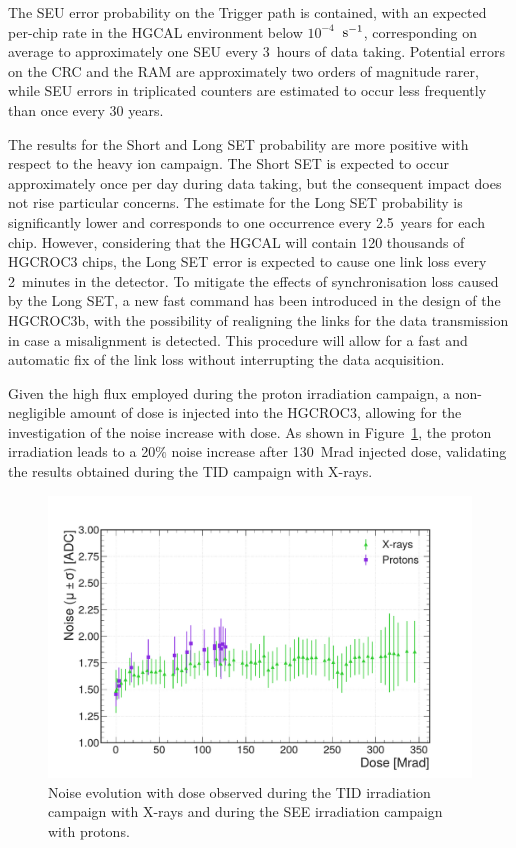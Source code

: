 The SEU error probability on the Trigger path is contained, with an expected per-chip rate in the HGCAL environment below $10^{-4}$~$\textnormal{s}^{-1}$, corresponding on average to approximately one SEU every 3~hours of data taking.
Potential errors on the CRC and the RAM are approximately two orders of magnitude rarer,  while SEU errors in triplicated counters are estimated to occur less frequently than once every 30 years.

The results for the Short and Long SET probability are more positive with respect to the heavy ion campaign. The Short SET is expected to occur approximately once per day during data taking, but the consequent impact does not rise particular concerns.
The estimate for the Long SET probability is significantly lower and corresponds to one occurrence every 2.5~years for each chip. However, considering that the HGCAL will contain 120 thousands of HGCROC3 chips, the Long SET error is expected to cause one link loss every 2~minutes in the detector.
To mitigate the effects of synchronisation loss caused by the Long SET, a new fast command has been introduced in the design of the HGCROC3b, with the possibility of realigning the links for the data transmission in case a misalignment is detected. This procedure will allow for a fast and automatic fix of the link loss without interrupting the data acquisition.

\bigbreak

Given the high flux employed during the proton irradiation campaign, a non-negligible amount of dose is injected into the HGCROC3, allowing for the investigation of the noise increase with dose. As shown in Figure~\ref{fig:NoiseEvolution}, the proton irradiation leads to a 20$\%$ noise increase after 130~Mrad injected dose, validating the results obtained during the TID campaign with X-rays.

\begin{figure}
    \centering
    \includegraphics[width=0.7\linewidth]{Figures/HGCAL/NoiseEvolution.pdf}
    \caption{Noise evolution with dose observed during the TID irradiation campaign with X-rays and during the SEE irradiation campaign with protons.}
    \label{fig:NoiseEvolution}
\end{figure}

